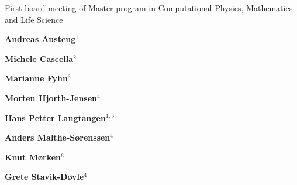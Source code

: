 \documentclass[%
oneside,                 %
final,                   %
10pt]{article}
\begin{document}






\thispagestyle{empty}

\begin{center}
{\LARGE\bf
\begin{spacing}{1.25}
First board meeting of Master program in Computational Physics, Mathematics and Life Science 
\end{spacing}
}
\end{center}


\begin{center}
{\bf Andreas Austeng${}^{1}$} \\ [0mm]
\end{center}


\begin{center}
{\bf Michele Cascella${}^{2}$} \\ [0mm]
\end{center}


\begin{center}
{\bf Marianne Fyhn${}^{3}$} \\ [0mm]
\end{center}


\begin{center}
{\bf Morten Hjorth-Jensen${}^{4}$} \\ [0mm]
\end{center}


\begin{center}
{\bf Hans Petter Langtangen${}^{1, 5}$} \\ [0mm]
\end{center}


\begin{center}
{\bf Anders Malthe-Sørenssen${}^{4}$} \\ [0mm]
\end{center}


\begin{center}
{\bf Knut Mørken${}^{6}$} \\ [0mm]
\end{center}


\begin{center}
{\bf Grete Stavik-Døvle${}^{4}$} \\ [0mm]
\end{center}
\end{document}
